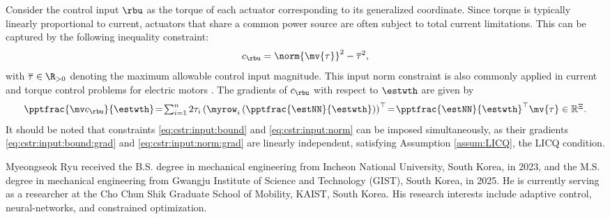 \documentclass[lettersize,journal]{IEEEtran}
\newcommand*{\template}{template}
\begin{document}
Consider the control input $\rbu$ as the torque of each actuator corresponding to its generalized coordinate. Since torque is typically linearly proportional to current, actuators that share a common power source are often subject to total current limitations. This can be captured by the following inequality constraint: 
\begin{equation}
    c_{\rbu}
    =
    \norm{
        \mv{\tau}
    }^2 
    -
    \overline\tau^2
    ,
    \label{eq:cstr:input:norm}
\end{equation}
with $\overline\tau\in\R_{>0}$ denoting the maximum allowable control input magnitude. This input norm constraint is also commonly applied in current and torque control problems for electric motors \cite{Choi:2024aa}.
The gradients of $c_{\rbu}$ with respect to $\estwth$ are given by
\begin{equation}
    \pptfrac{\mv c_{\rbu}}{\estwth}
    \!=\! 
    \textstyle\sum_{i=1}^n 2\tau_{i} 
    \left(
        \myrow_i
        \left(
            \pptfrac{\estNN}{\estwth}
        \right)
    \right)^\top  
    \!=\! 
    {\pptfrac{\estNN}{\estwth}}^\top
    \mv{\tau}
    \in \mathbb R^{\Xi}.
    \label{eq:cstr:input:norm:grad}
\end{equation}
It should be noted that constraints \eqref{eq:cstr:input:bound} and \eqref{eq:cstr:input:norm} can be imposed simultaneously, as their gradients \eqref{eq:cstr:input:bound:grad} and \eqref{eq:cstr:input:norm:grad} are linearly independent, satisfying Assumption \ref{assum:LICQ}, \ie the LICQ condition.

\printbibliography


\begin{IEEEbiography}{Myeongseok Ryu}
    received the B.S. degree in mechanical engineering from Incheon National University, South Korea, in 2023, and the M.S. degree in mechanical engineering from Gwangju Institute of Science and Technology (GIST), South Korea, in 2025. 
    He is currently serving as a researcher at the Cho Chun Shik Graduate School of Mobility, KAIST, South Korea.
    His research interests include adaptive control, neural-networks, and constrained optimization.
\end{IEEEbiography}
\end{document}
